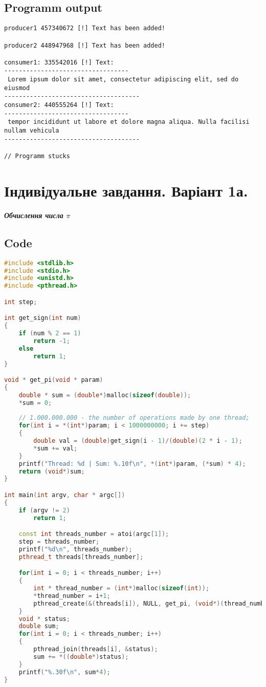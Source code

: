 \documentclass{article}
\begin{document}
\subsection{Programm output}
\begin{verbatim}
producer1 457340672 [!] Text has been added! 

producer2 448947968 [!] Text has been added! 

consumer1: 335542016 [!] Text: 
----------------------------------
 Lorem ipsum dolor sit amet, consectetur adipiscing elit, sed do eiusmod 
-------------------------------------
consumer2: 440555264 [!] Text: 
----------------------------------
 tempor incididunt ut labore et dolore magna aliqua. Nulla facilisi nullam vehicula 
-------------------------------------

// Programm stucks

\end{verbatim}

\newpage
\section{Індивідуальне завдання. Варіант 1а.}
\textbf{\textit{ Обчислення числа $\pi$}}

\subsection{Code}

\begin{lstlisting}[language=C++]
#include <stdlib.h>
#include <stdio.h>
#include <unistd.h>
#include <pthread.h>

int step;

int get_sign(int num)
{
    if (num % 2 == 1)
        return -1;
    else
        return 1;
}

void * get_pi(void * param)
{
    double * sum = (double*)malloc(sizeof(double));
    *sum = 0;
    
    // 1.000.000.000 - the number of operations made by one thread; 
    for(int i = *(int*)param; i < 1000000000; i += step)
    {
        double val = (double)get_sign(i - 1)/(double)(2 * i - 1);
        *sum += val;
    }
    printf("Thread: %d | Sum: %.10f\n", *(int*)param, (*sum) * 4);
    return (void*)sum;
}

int main(int argv, char * argc[])
{
    if (argv != 2)
        return 1;

    const int threads_number = atoi(argc[1]);
    step = threads_number;
    printf("%d\n", threads_number);
    pthread_t threads[threads_number];

    for(int i = 0; i < threads_number; i++)
    {
        int * thread_number = (int*)malloc(sizeof(int));
        *thread_number = i+1;
        pthread_create(&(threads[i]), NULL, get_pi, (void*)(thread_number));
    }
    void * status;
    double sum;
    for(int i = 0; i < threads_number; i++)
    {
        pthread_join(threads[i], &status);
        sum += *((double*)status);
    }
    printf("%.30f\n", sum*4);
}
\end{lstlisting}
\newpage
\end{document}
